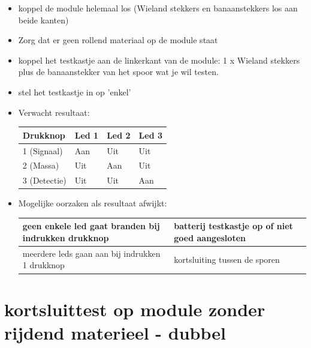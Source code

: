 \documentclass[12pt,a4paper]{report}
\begin{document}
\begin{itemize}
\item koppel de module helemaal los (Wieland stekkers en banaanstekkers los aan beide kanten) 
\item Zorg dat er geen rollend materiaal op de module staat
\item koppel het testkastje aan de linkerkant van de module: 1 x Wieland stekkers plus de banaanstekker van het spoor wat je wil testen. 

\item stel het testkastje in op 'enkel' 
\item Verwacht resultaat:
\\
\begin{tabular}{|l|l|l|l|}
\hline
Drukknop&Led 1&Led 2&Led 3\\
\hline
1 (Signaal)&Aan&Uit&Uit\\
\hline
2 (Massa)&Uit&Aan&Uit\\
\hline
3 (Detectie)&Uit&Uit&Aan\\
\hline
\end{tabular}

\item Mogelijke oorzaken als resultaat afwijkt:\\
\begin{tabular}{|p{8cm}|p{6cm}|}
\hline
geen enkele led gaat branden bij indrukken drukknop&batterij testkastje op of niet goed aangesloten\\
\hline
meerdere leds gaan aan bij indrukken 1 drukknop&kortsluiting tussen de sporen\\
\hline
\end{tabular}

\end{itemize}

\section{kortsluittest op module zonder rijdend materieel - dubbel}
\end{document}
